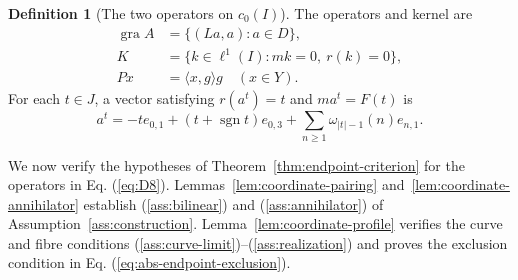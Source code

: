 \documentclass[11pt]{article}
\newcommand{\gra}{\operatorname{gra}}
\newcommand{\sgn}{\operatorname{sgn}}
\newcommand{\pair}[2]{\langle #1,#2\rangle}
\theoremstyle{definition}
\newtheorem{definition}{Definition}
\theoremstyle{remark}
\begin{document}
\begin{definition}[The two operators on $c_0(I)$]
The operators and kernel are
\begin{equation}
\begin{aligned}
\gra A&=\{(La,a):a\in D\},\\
K&=\{k\in\ell^1(I):mk=0,\ r(k)=0\},\\
Px&=\pair{x}{g}g\quad(x\in Y).
\end{aligned}
\label{eq:D8}
\end{equation}
For each $t\in J$, a vector satisfying $r(a^t)=t$ and $ma^t=F(t)$ is
\begin{equation}
a^t=-t e_{0,1}+(t+\sgn t)e_{0,3}
       +\sum_{n\ge1}\omega_{|t|-1}(n)e_{n,1}.
\label{eq:D9}
\end{equation}
\end{definition}

\label{sec:supporting}





We now verify the hypotheses of Theorem~\ref{thm:endpoint-criterion} for the operators in Eq. (\ref{eq:D8}). Lemmas~\ref{lem:coordinate-pairing} and~\ref{lem:coordinate-annihilator} establish \textup{(\ref{ass:bilinear})} and \textup{(\ref{ass:annihilator})} of Assumption~\ref{ass:construction}. Lemma~\ref{lem:coordinate-profile} verifies the curve and fibre conditions \textup{(\ref{ass:curve-limit})}--\textup{(\ref{ass:realization})} and proves the exclusion condition in Eq. (\ref{eq:abs-endpoint-exclusion}).
\end{document}
